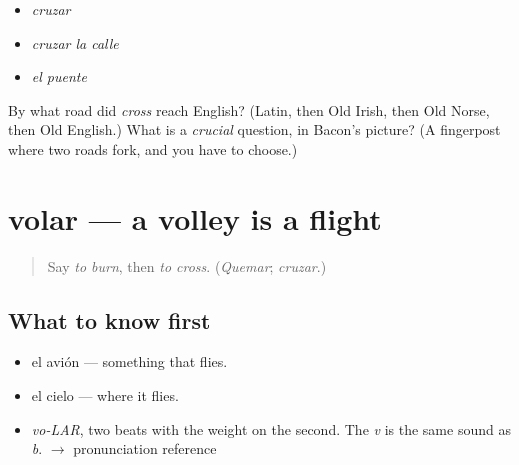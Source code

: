 \begin{itemize}
\raggedright
  \item \emph{cruzar}
  \item \emph{cruzar la calle}
  \item \emph{el puente}
\end{itemize}

\begin{tcolorbox}[breakable,colback=teal!4,colframe=teal!35!black,title={Before you move on}]
By what road did \emph{cross} reach English? (Latin, then Old Irish, then Old Norse, then Old English.) What is a \emph{crucial} question, in Bacon's picture? (A fingerpost where two roads fork, and you have to choose.)
\end{tcolorbox}
\section[volar]{volar — a volley is a flight}

\label{lesson:ES-C387-volar}



\begin{quote}
Say \emph{to burn}, then \emph{to cross}. (\emph{Quemar}; \emph{cruzar}.)
\end{quote}

\subsection*{What to know first}
\begin{itemize}
\raggedright
  \item el avión — something that flies.
  \item el cielo — where it flies.
\end{itemize}

\begin{sounds}
\begin{itemize}
\raggedright
  \item \emph{vo-LAR}, two beats with the weight on the second. The \emph{v} is the same sound as \emph{b}. $\to$ pronunciation reference
\end{itemize}
\end{sounds}

